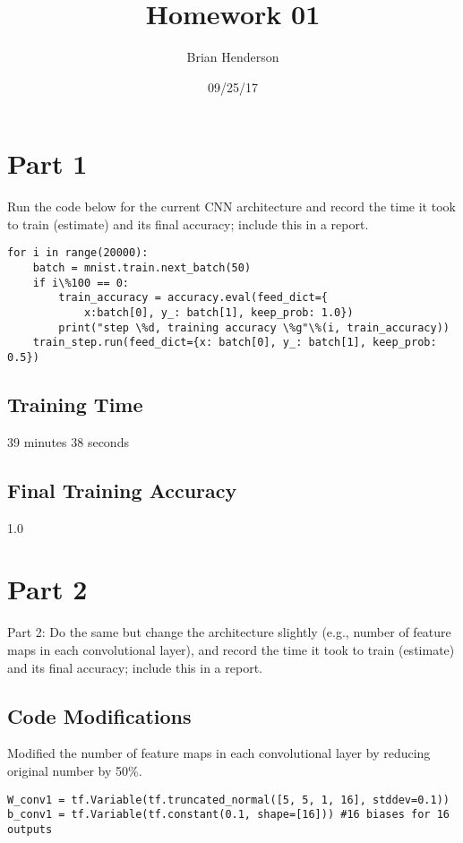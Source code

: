 \documentclass[a4paper]{article}
\title{Homework 01}
\author{Brian Henderson}
\date{09/25/17}
\begin{document}
\lstset{language=python}

\maketitle

\section{Part 1}
 Run the code below for the current CNN architecture and record the time it took to train (estimate) and its final accuracy; include this in a report.
\\
\begin{lstlisting}[frame=single]
for i in range(20000):
    batch = mnist.train.next_batch(50)
    if i\%100 == 0:
        train_accuracy = accuracy.eval(feed_dict={
            x:batch[0], y_: batch[1], keep_prob: 1.0})
        print("step \%d, training accuracy \%g"\%(i, train_accuracy))
    train_step.run(feed_dict={x: batch[0], y_: batch[1], keep_prob: 0.5})
\end{lstlisting}

\subsection{Training Time}
39 minutes 38 seconds

\subsection{Final Training Accuracy}
1.0

\section{Part 2}
Part 2: Do the same but change the architecture slightly (e.g., number of feature maps in each convolutional layer), and record the time it took to train (estimate) and its final accuracy; include this in a report.
\\
\subsection{Code Modifications}
Modified the number of feature maps in each convolutional layer by reducing original number by 50\%. 

\begin{lstlisting}[frame=single]
W_conv1 = tf.Variable(tf.truncated_normal([5, 5, 1, 16], stddev=0.1))
b_conv1 = tf.Variable(tf.constant(0.1, shape=[16])) #16 biases for 16 outputs
\end{lstlisting} 
\end{document}
